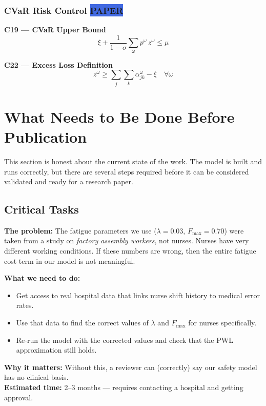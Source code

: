 \documentclass[12pt,a4paper]{article}
\newcommand{\frombadge}{\colorbox{royalblue}{\tiny\color{white}\textbf{PAPER}}\,}
\begin{document}
\subsubsection{CVaR Risk Control \frombadge}

\begin{eqbox}
\textbf{C19 — CVaR Upper Bound}
\begin{equation}
  \xi + \frac{1}{1-\sigma}\sum_{\omega} p^{\omega}\, z^{\omega} \leq \mu
\end{equation}

\textbf{C22 — Excess Loss Definition}
\begin{equation}
  z^{\omega} \geq \sum_j\sum_k \alpha_{jk}^{\omega} - \xi \quad \forall\omega
\end{equation}
\end{eqbox}

\newpage
\section{What Needs to Be Done Before Publication}

This section is honest about the current state of the work. The model is built and runs correctly, but there are several steps required before it can be considered validated and ready for a research paper.

\subsection{Critical Tasks}

\begin{warnbox}
\textbf{The problem:} The fatigue parameters we use ($\lambda=0.03$, $F_{\max}=0.70$) were taken from a study on \emph{factory assembly workers}, not nurses. Nurses have very different working conditions. If these numbers are wrong, then the entire fatigue cost term in our model is not meaningful.

\textbf{What we need to do:}
\begin{itemize}[itemsep=2pt]
  \item Get access to real hospital data that links nurse shift history to medical error rates.
  \item Use that data to find the correct values of $\lambda$ and $F_{\max}$ for nurses specifically.
  \item Re-run the model with the corrected values and check that the PWL approximation still holds.
\end{itemize}

\textbf{Why it matters:} Without this, a reviewer can (correctly) say our safety model has no clinical basis.\\
\textbf{Estimated time:} 2–3 months — requires contacting a hospital and getting approval.
\end{warnbox}
\end{document}
